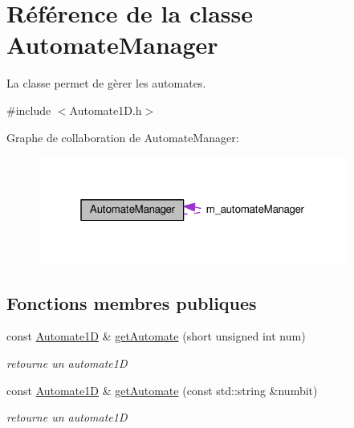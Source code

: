 \hypertarget{class_automate_manager}{}\section{Référence de la classe Automate\+Manager}
\label{class_automate_manager}


La classe permet de gèrer les automates.  




{\ttfamily \#include $<$Automate1\+D.\+h$>$}



Graphe de collaboration de Automate\+Manager\+:\nopagebreak
\begin{figure}[H]
\begin{center}
\leavevmode
\includegraphics[width=289pt]{class_automate_manager__coll__graph}
\end{center}
\end{figure}
\subsection*{Fonctions membres publiques}
\begin{DoxyCompactItemize}
\item 
const \hyperlink{class_automate1_d}{Automate1D} \& \hyperlink{class_automate_manager_a534cff7abbced831621b521e8fb2e56c}{get\+Automate} (short unsigned int num)
\begin{DoxyCompactList}\small\item\em retourne un automate1D \end{DoxyCompactList}\item 
const \hyperlink{class_automate1_d}{Automate1D} \& \hyperlink{class_automate_manager_ad6321c641c0c79e237ea65a880ff13ed}{get\+Automate} (const std\+::string \&numbit)
\begin{DoxyCompactList}\small\item\em retourne un automate1D \end{DoxyCompactList}\end{DoxyCompactItemize}
